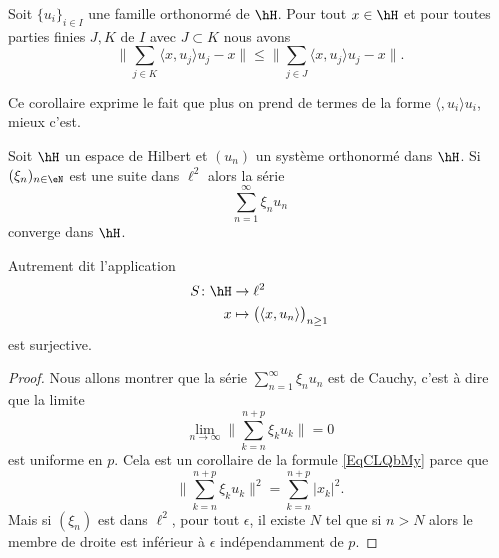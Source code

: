 \begin{corollary}
    Soit \( \{ u_i \}_{i\in I}\) une famille orthonormé de \( \hH\). Pour tout \( x\in \hH\) et pour toutes parties finies \( J,K\) de \( I\) avec \( J\subset K\) nous avons
    \begin{equation}
        \| \sum_{j\in K}\langle x, u_j\rangle u_j-x \|\leq \| \sum_{j\in J}\langle x, u_j\rangle u_j-x \|.
    \end{equation}
\end{corollary}
Ce corollaire exprime le fait que plus on prend de termes de la forme \( \langle , u_i\rangle u_i\), mieux c'est.

\begin{proposition}     \label{PropzaKXHq}
    Soit \( \hH\) un espace de Hilbert et \( (u_n)\) un système orthonormé dans \( \hH\). Si \( (\xi_n)_{n\in \eN}\) est une suite dans \( \ell^2\) alors la série 
    \begin{equation}
        \sum_{n=1}^{\infty}\xi_nu_n
    \end{equation}
    converge dans \( \hH\).

    Autrement dit l'application
    \begin{equation}
        \begin{aligned}
            S\colon \hH&\to \ell^2 \\
            x&\mapsto \big( \langle x, u_n\rangle  \big)_{n\geq 1} 
        \end{aligned}
    \end{equation}
    est surjective.
\end{proposition}

\begin{proof}
    Nous allons montrer que la série \( \sum_{n=1}^{\infty}\xi_nu_n\) est de Cauchy, c'est à dire que la limite
    \begin{equation}
        \lim_{n\to \infty} \big\| \sum_{k=n}^{n+p}\xi_ku_k \big\|=0
    \end{equation}
    est uniforme en \( p\). Cela est un corollaire de la formule \eqref{EqCLQbMy} parce que
    \begin{equation}
        \big\| \sum_{k=n}^{n+p}\xi_ku_k \big\|^2=\sum_{k=n}^{n+p}| x_k |^2.
    \end{equation}
    Mais si \( (\xi_n)\) est dans \( \ell^2\), pour tout \( \epsilon\), il existe \( N\) tel que si \( n>N\) alors le membre de droite est inférieur à \( \epsilon\) indépendamment de \( p\).
\end{proof}

